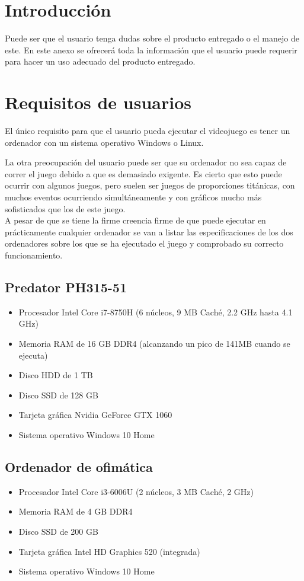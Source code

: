 
\section{Introducción}
Puede ser que el usuario tenga dudas sobre el producto entregado o el manejo de este. En este anexo se ofrecerá toda la información que el usuario puede requerir para hacer un uso adecuado del producto entregado.

\section{Requisitos de usuarios}
El único requisito para que el usuario pueda ejecutar el videojuego es tener un ordenador con un sistema operativo Windows o Linux.

La otra preocupación del usuario puede ser que su ordenador no sea capaz de correr el juego debido a que es demasiado exigente. Es cierto que esto puede ocurrir con algunos juegos, pero suelen ser juegos de proporciones titánicas, con muchos eventos ocurriendo simultáneamente y con gráficos mucho más sofisticados que los de este juego.\\
A pesar de que se tiene la firme creencia firme de que puede ejecutar en prácticamente cualquier ordenador se van a listar las especificaciones de los dos ordenadores sobre los que se ha ejecutado el juego y comprobado su correcto funcionamiento.

\subsection{Predator PH315-51}
\begin{itemize}
\item
Procesador Intel Core i7-8750H (6 núcleos, 9 MB Caché, 2.2 GHz hasta 4.1 GHz)
\item
Memoria RAM de 16 GB DDR4 (alcanzando un pico de 141MB cuando se ejecuta)
\item
Disco HDD de 1 TB
\item
Disco SSD de 128 GB
\item
Tarjeta gráfica Nvidia GeForce GTX 1060
\item
Sistema operativo Windows 10 Home
\end{itemize}

\subsection{Ordenador de ofimática}
\begin{itemize}
\item
Procesador Intel Core i3-6006U (2 núcleos, 3 MB Caché, 2 GHz)
\item
Memoria RAM de 4 GB DDR4
\item
Disco SSD de 200 GB
\item
Tarjeta gráfica Intel HD Graphics 520 (integrada)
\item
Sistema operativo Windows 10 Home
\end{itemize}

